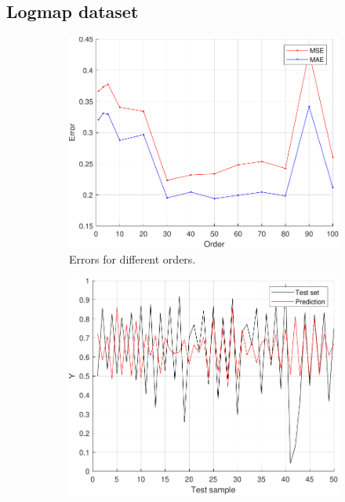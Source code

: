 \documentclass{article}
\begin{document}
    \subsection{Logmap dataset}
        \begin{figure}[h]
             \centering
             \hspace{0.05\textwidth}
             \begin{subfigure}[b]{0.4\textwidth}
                 \centering
                 \includegraphics[width=\textwidth]{Assignment 2/figures/2_2/MSEvsMAE_ordersweep.pdf}
                 \caption{Errors for different orders.}
                 \label{fig:order_sweep}
             \end{subfigure}
             \hfill
             \begin{subfigure}[b]{0.4\textwidth}
                 \centering
                 \includegraphics[width=\textwidth]{Assignment 2/figures/2_2/prediction.pdf}

\end{subfigure}
\end{figure}
\end{document}
